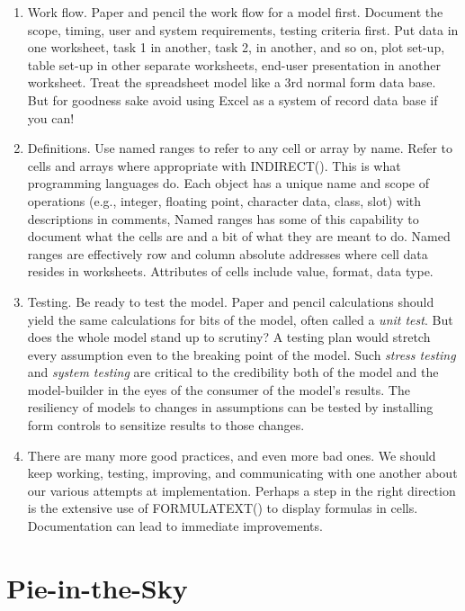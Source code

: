 \documentclass[
]{book}
\begin{document}
\begin{enumerate}
\def\labelenumi{\arabic{enumi}.}
\item
  Work flow. Paper and pencil the work flow for a model first. Document the scope, timing, user and system requirements, testing criteria first. Put data in one worksheet, task 1 in another, task 2, in another, and so on, plot set-up, table set-up in other separate worksheets, end-user presentation in another worksheet. Treat the spreadsheet model like a 3rd normal form data base. But for goodness sake avoid using Excel as a system of record data base if you can!
\item
  Definitions. Use named ranges to refer to any cell or array by name. Refer to cells and arrays where appropriate with INDIRECT(). This is what programming languages do. Each object has a unique name and scope of operations (e.g., integer, floating point, character data, class, slot) with descriptions in comments, Named ranges has some of this capability to document what the cells are and a bit of what they are meant to do. Named ranges are effectively row and column absolute addresses where cell data resides in worksheets. Attributes of cells include value, format, data type.
\item
  Testing. Be ready to test the model. Paper and pencil calculations should yield the same calculations for bits of the model, often called a \emph{unit test}. But does the whole model stand up to scrutiny? A testing plan would stretch every assumption even to the breaking point of the model. Such \emph{stress testing} and \emph{system testing} are critical to the credibility both of the model and the model-builder in the eyes of the consumer of the model's results. The resiliency of models to changes in assumptions can be tested by installing form controls to sensitize results to those changes.
\item
  There are many more good practices, and even more bad ones. We should keep working, testing, improving, and communicating with one another about our various attempts at implementation. Perhaps a step in the right direction is the extensive use of FORMULATEXT() to display formulas in cells. Documentation can lead to immediate improvements.
\end{enumerate}

\hypertarget{pie-in-the-sky}{%
\section{Pie-in-the-Sky}\label{pie-in-the-sky}}
\end{document}
